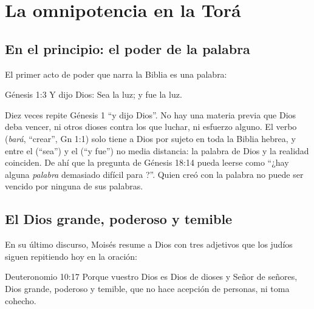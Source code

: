 
\section{La omnipotencia en la Torá}

\subsection{En el principio: el poder de la palabra}

El primer acto de poder que narra la Biblia es una palabra:

\begin{verso}{Génesis 1:3}
Y dijo Dios: Sea la luz; y fue la luz.
\end{verso}

Diez veces repite Génesis 1 ``y dijo Dios''. No hay una materia previa que Dios deba vencer, ni otros dioses contra los que luchar, ni esfuerzo alguno. El verbo  (\emph{bará}, ``crear'', Gn 1:1) solo tiene a Dios por sujeto en toda la Biblia hebrea, y entre el  (``sea'') y el  (``y fue'') no media distancia: la palabra de Dios y la realidad coinciden. De ahí que la pregunta de Génesis 18:14 pueda leerse como ``¿hay alguna \emph{palabra} demasiado difícil para \SENOR?''. Quien creó con la palabra no puede ser vencido por ninguna de sus palabras.

\subsection{El Dios grande, poderoso y temible}

En su último discurso, Moisés resume a Dios con tres adjetivos que los judíos siguen repitiendo hoy en la oración:

\begin{verso}{Deuteronomio 10:17}
Porque \SENOR{} vuestro Dios es Dios de dioses y Señor de señores, Dios grande, poderoso y temible, que no hace acepción de personas, ni toma cohecho.
\end{verso}

